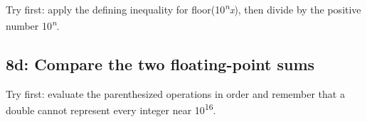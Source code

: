 \documentclass[11pt]{article}
\begin{document}
\begin{keepsection}
\begin{keepsection}
Try first: apply the defining inequality for floor(10\textsuperscript{\textit{n}}\textit{x}), then divide by the positive number 10\textsuperscript{\textit{n}}.

\end{keepsection}

\begin{keepsection}
\subsection{8d: Compare the two floating-point sums}

Try first: evaluate the parenthesized operations in order and remember that a double cannot represent every integer near 10\textsuperscript{16}.

\end{keepsection}
\end{keepsection}
\end{document}
